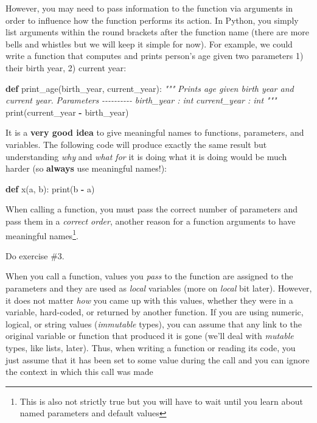\documentclass[
]{book}
\newenvironment{Shaded}{\begin{snugshade}}{\end{snugshade}}
\newcommand{\BuiltInTok}[1]{#1}
\newcommand{\CommentTok}[1]{\textcolor[rgb]{0.56,0.35,0.01}{\textit{#1}}}
\newcommand{\KeywordTok}[1]{\textcolor[rgb]{0.13,0.29,0.53}{\textbf{#1}}}
\newcommand{\NormalTok}[1]{#1}
\newcommand{\OperatorTok}[1]{\textcolor[rgb]{0.81,0.36,0.00}{\textbf{#1}}}
\begin{document}
However, you may need to pass information to the function via arguments in order to influence how the function performs its action. In Python, you simply list arguments within the round brackets after the function name (there are more bells and whistles but we will keep it simple for now). For example, we could write a function that computes and prints person's age given two parameters 1) their birth year, 2) current year:

\begin{Shaded}
\begin{Highlighting}[]
\KeywordTok{def}\NormalTok{ print\_age(birth\_year, current\_year):}
    \CommentTok{"""}
\CommentTok{    Prints age given birth year and current year.}
\CommentTok{    }
\CommentTok{    Parameters}
\CommentTok{    {-}{-}{-}{-}{-}{-}{-}{-}{-}{-}}
\CommentTok{    birth\_year : int}
\CommentTok{    current\_year : int}
\CommentTok{    """}
    \BuiltInTok{print}\NormalTok{(current\_year }\OperatorTok{{-}}\NormalTok{ birth\_year)}
\end{Highlighting}
\end{Shaded}

It is a \textbf{very good idea} to give meaningful names to functions, parameters, and variables. The following code will produce exactly the same result but understanding \emph{why} and \emph{what for} it is doing what it is doing would be much harder (so \textbf{always} use meaningful names!):

\begin{Shaded}
\begin{Highlighting}[]
\KeywordTok{def}\NormalTok{ x(a, b):}
    \BuiltInTok{print}\NormalTok{(b }\OperatorTok{{-}}\NormalTok{ a)}
\end{Highlighting}
\end{Shaded}

When calling a function, you must pass the correct number of parameters and pass them in a \emph{correct order}, another reason for a function arguments to have meaningful names\footnote{This is also not strictly true but you will have to wait until you learn about named parameters and default values}.

Do exercise \#3.

When you call a function, values you \emph{pass} to the function are assigned to the parameters and they are used as \emph{local} variables (more on \emph{local} bit later). However, it does not matter \emph{how} you came up with this values, whether they were in a variable, hard-coded, or returned by another function. If you are using numeric, logical, or string values (\emph{immutable} types), you can assume that any link to the original variable or function that produced it is gone (we'll deal with \emph{mutable} types, like lists, later). Thus, when writing a function or reading its code, you just assume that it has been set to some value during the call and you can ignore the context in which this call was made
\end{document}
